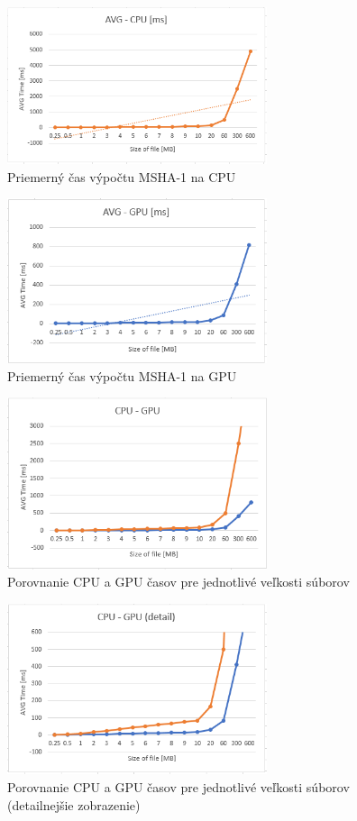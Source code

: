 \documentclass[conference]{IEEEtran}
\begin{document}
\begin{figure}[h!]
\centering
\includegraphics[width=3in]{img/AVG-CPU}
\caption{Priemerný čas výpočtu MSHA-1 na CPU}
\end{figure}


\begin{figure}[h!]
\centering
\includegraphics[width=3in]{img/AVG-GPU}
\caption{Priemerný čas výpočtu MSHA-1 na GPU}
\end{figure}

\begin{figure}[h!]
\centering
\includegraphics[width=3in]{img/CPU-GPU}
\caption{Porovnanie CPU a GPU časov pre jednotlivé veľkosti súborov}
\end{figure}

\begin{figure}[h!]
\centering
\includegraphics[width=3in]{img/CPU-GPUdetail}
\caption{Porovnanie CPU a GPU časov pre jednotlivé veľkosti súborov (detailnejšie zobrazenie)}
\end{figure}
\end{document}
